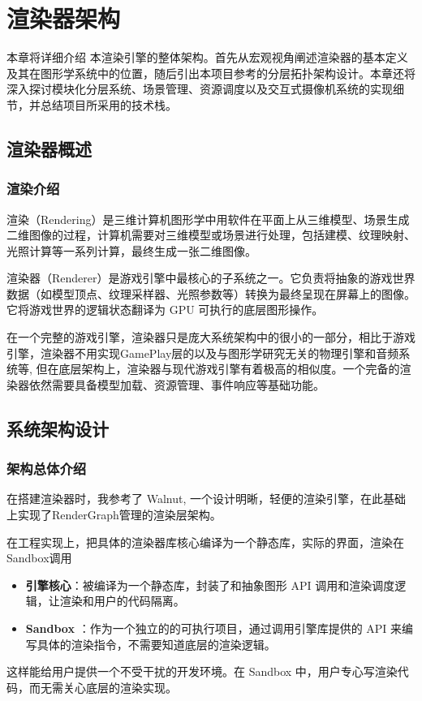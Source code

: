 \chapter{渲染器架构}

本章将详细介绍 本渲染引擎的整体架构。首先从宏观视角阐述渲染器的基本定义及其在图形学系统中的位置，随后引出本项目参考的分层拓扑架构设计。本章还将深入探讨模块化分层系统、场景管理、资源调度以及交互式摄像机系统的实现细节，并总结项目所采用的技术栈。

\section{渲染器概述}

\subsection{渲染介绍}

渲染（Rendering）是三维计算机图形学中用软件在平面上从三维模型、场景生成二维图像的过程，计算机需要对三维模型或场景进行处理，包括建模、纹理映射、光照计算等一系列计算，最终生成一张二维图像。


渲染器（Renderer）是游戏引擎中最核心的子系统之一。它负责将抽象的游戏世界数据（如模型顶点、纹理采样器、光照参数等）转换为最终呈现在屏幕上的图像。它将游戏世界的逻辑状态翻译为 GPU 可执行的底层图形操作。

在一个完整的游戏引擎，渲染器只是庞大系统架构中的很小的一部分，相比于游戏引擎，渲染器不用实现GamePlay层的以及与图形学研究无关的物理引擎和音频系统等, 但在底层架构上，渲染器与现代游戏引擎有着极高的相似度。一个完备的渲染器依然需要具备模型加载、资源管理、事件响应等基础功能。

\section{系统架构设计}

\subsection{架构总体介绍}
在搭建渲染器时，我参考了 Walnut, 一个设计明晰，轻便的渲染引擎，在此基础上实现了RenderGraph管理的渲染层架构。

在工程实现上，把具体的渲染器库核心编译为一个静态库，实际的界面，渲染在Sandbox调用
\begin{itemize}
    \item \textbf{引擎核心}：被编译为一个静态库，封装了和抽象图形 API 调用和渲染调度逻辑，让渲染和用户的代码隔离。
    \item \textbf{ Sandbox }：作为一个独立的的可执行项目，通过调用引擎库提供的 API 来编写具体的渲染指令，不需要知道底层的渲染逻辑。
\end{itemize}
这样能给用户提供一个不受干扰的开发环境。在 Sandbox 中，用户专心写渲染代码，而无需关心底层的渲染实现。

